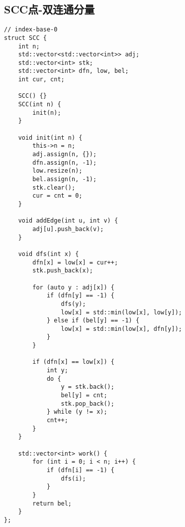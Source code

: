 \subsection{SCC点-双连通分量}
\begin{lstlisting}
// index-base-0
struct SCC {
    int n;
    std::vector<std::vector<int>> adj;
    std::vector<int> stk;
    std::vector<int> dfn, low, bel;
    int cur, cnt;
    
    SCC() {}
    SCC(int n) {
        init(n);
    }
    
    void init(int n) {
        this->n = n;
        adj.assign(n, {});
        dfn.assign(n, -1);
        low.resize(n);
        bel.assign(n, -1);
        stk.clear();
        cur = cnt = 0;
    }
    
    void addEdge(int u, int v) {
        adj[u].push_back(v);
    }
    
    void dfs(int x) {
        dfn[x] = low[x] = cur++;
        stk.push_back(x);
        
        for (auto y : adj[x]) {
            if (dfn[y] == -1) {
                dfs(y);
                low[x] = std::min(low[x], low[y]);
            } else if (bel[y] == -1) {
                low[x] = std::min(low[x], dfn[y]);
            }
        }
        
        if (dfn[x] == low[x]) {
            int y;
            do {
                y = stk.back();
                bel[y] = cnt;
                stk.pop_back();
            } while (y != x);
            cnt++;
        }
    }
    
    std::vector<int> work() {
        for (int i = 0; i < n; i++) {
            if (dfn[i] == -1) {
                dfs(i);
            }
        }
        return bel;
    }
};
\end{lstlisting}

